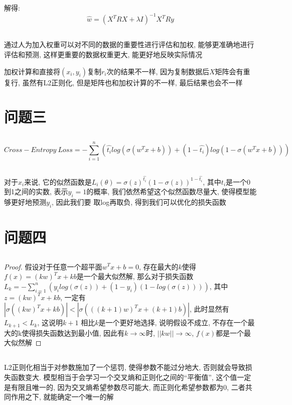 \documentclass[12pt, a4paper]{article}
\begin{document}
解得:
\begin{equation*}
    \hat{w} = (X^T R X + \lambda I)^{-1} X^T R y
\end{equation*}

\subsection{}

通过人为加入权重可以对不同的数据的重要性进行评估和加权, 能够更准确地进行评估和预测, 
这样更重要的数据权重更大, 能更好地反映实际情况

加权计算和直接将$(x_i,y_i)$复制$r_i$次的结果不一样, 因为复制数据后$X$矩阵会有重复行, 
虽然有L2正则化, 但是矩阵也和加权计算的不一样, 最后结果也会不一样

\section{问题三}


\subsection{}

\begin{equation*}
    Cross-Entropy \ Loss = - \sum_{i=1}^n (\hat{t_i} log(\sigma(w^Tx+b))
     + (1-\hat{t_i}) log (1- \sigma(w^Tx+b)))
\end{equation*}

\subsection{}

对于$x_i$来说, 它的似然函数是$L_i(\theta) = \sigma(z)^{\hat{t_i}} 
(1-\sigma(z))^{1-\hat{t_i}}$, 其中$t_i$是一个0到1之间的实数, 表示$y_i=1$的概率, 
我们依然希望这个似然函数尽量大, 使得模型能够更好地预测$y_i$, 因此我们要
取log再取负, 得到我们可以优化的损失函数

\section{问题四}


\subsection{}

\newtheorem*{proof}{Proof}

\begin{proof}
    假设对于任意一个超平面$w^T x + b = 0$, 存在最大的$k$使得$f(x) = (kw)^T x + kb$是一个最大似然解, 
    那么对于损失函数$L_k = - \sum_{i=1}^n(y_i log(\sigma(z))+(1-y_i)(1-log(\sigma(z))))$, 其中$z = (kw)^T x + kb$, 
    一定有$|\sigma((kw)^T x + kb)| < |\sigma(((k+1)w)^T x + (k+1)b)|$, 此时显然有$L_{k+1}<L_k$, 这说明$k+1$
    相比$k$是一个更好地选择, 说明假设不成立, 不存在一个最大的k使得损失函数达到最小值, 因此有$k \rightarrow \infty$时, 
    $||kw|| \rightarrow \infty$, $f(x)$都是一个最大似然解
\end{proof}

\subsection{}

L2正则化相当于对参数施加了一个惩罚, 使得参数不能过分地大, 否则就会导致损失函数变大. 
模型相当于会学习一个交叉熵和正则化之间的“平衡值”, 这个值一定是有限且唯一的,
因为交叉熵希望参数尽可能大, 而正则化希望参数都为0, 二者共同作用之下, 就能确定一个唯一的解
\end{document}

